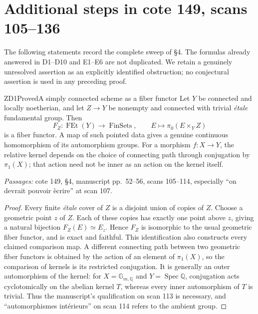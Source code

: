 \section{Additional steps in cote 149, scans 105--136}
The following statements record the complete sweep of \S4. The formulas already answered in D1--D10 and E1--E6 are not duplicated. We retain a genuinely unresolved assertion as an explicitly identified obstruction; no conjectural assertion is used in any preceding proof.

\begin{result}{ZD1}{Proved}{A simply connected scheme as a fiber functor}
Let $Y$ be connected and locally noetherian, and let $Z\to Y$ be nonempty and connected with trivial \emph{\'etale} fundamental group. Then
\[
 F_Z:\operatorname{FEt}(Y)\longrightarrow\operatorname{FinSets},\qquad
 E\longmapsto\pi_0(E\times_Y Z)
\]
is a fiber functor. A map of such pointed data gives a genuine continuous homomorphism of its automorphism groups. For a morphism $f:X\to Y$, the relative kernel depends on the choice of connecting path through conjugation by $\pi_1(X)$; that action need not be inner as an action on the kernel itself.
\par\emph{Passages:} cote 149, \S4, manuscript pp.~52--56, scans 105--114, especially ``on devrait pouvoir \`ecrire'' at scan 107.
\end{result}
\begin{proof}
Every finite \emph{\'etale} cover of $Z$ is a disjoint union of copies of $Z$. Choose a geometric point $z$ of $Z$. Each of these copies has exactly one point above $z$, giving a natural bijection $F_Z(E)\simeq E_z$. Hence $F_Z$ is isomorphic to the usual geometric fiber functor, and is exact and faithful. This identification also constructs every claimed comparison map. A different connecting path between two geometric fiber functors is obtained by the action of an element of $\pi_1(X)$, so the comparison of kernels is its restricted conjugation. It is generally an outer automorphism of the kernel: for $X=\mathbb G_{m,\mathbb Q}$ and $Y=\operatorname{Spec}\mathbb Q$, conjugation acts cyclotomically on the abelian kernel $T$, whereas every inner automorphism of $T$ is trivial. Thus the manuscript's qualification on scan 113 is necessary, and ``automorphismes int\'erieurs'' on scan 114 refers to the ambient group.
\end{proof}

